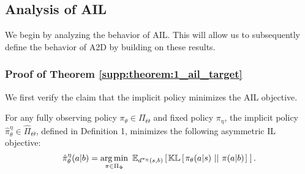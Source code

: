 \subsection{Analysis of AIL}
\label{supp:sec:ail}

We begin by analyzing the behavior of AIL.  This will allow us to subsequently define the behavior of A2D by building on these results.

\subsubsection{Proof of Theorem \ref{supp:theorem:1_ail_target}}
\label{supp:sec:t1}

We first verify the claim that the implicit policy minimizes the AIL objective.

\setcounter{sthe}{\value{theorem}}
\setcounter{theorem}{0}                   %
\begin{theorem}\label{supp:theorem:1_ail_target}
For any fully observing policy $\pi_{\theta} \in \Pi_{\Theta}$ and fixed policy $\pi_{\eta}$, the implicit policy $\hat{\pi}_{\theta}^{\eta} \in \hat{\Pi}_{\Theta}$, defined in Definition 1, minimizes the following asymmetric IL objective:
\begin{equation}
      \hat{\pi}_{\theta}^{\eta}(a|b) = \mathop{\argmin}_{\pi \in \Pi_{\Phi}}\ \mathbb{E}_{d^{\pi_{\eta}}(s,b)}  \lspsqb{}  \mathbb{KL} \lspsqb{}  \pi_{\theta}(a|s) \klbars{} \pi(a|b) \rspsqb{}  \rspsqb{} .
\end{equation}
\end{theorem}
\setcounter{theorem}{\value{sthe}}
